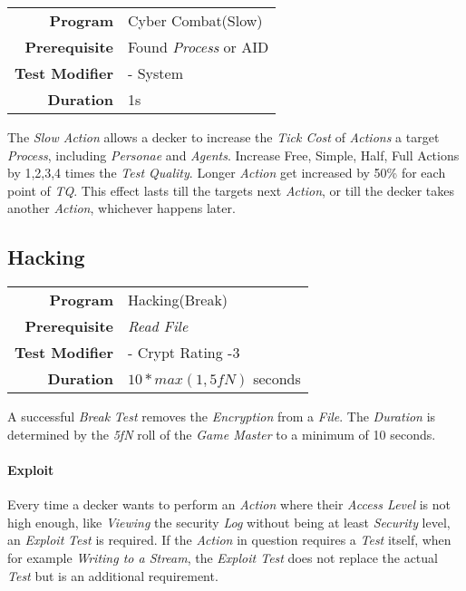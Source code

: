 \begin{tabular}{rl}
    \textbf{Program}       & Cyber Combat(Slow)          \\
    \textbf{Prerequisite}  & Found \emph{Process} or AID \\
    \textbf{Test Modifier} & - System                    \\
    \textbf{Duration}      & 1s                          \\
\end{tabular}

\hfill

The \emph{Slow Action} allows a decker to increase the \emph{Tick Cost} of
\emph{Actions} a target \emph{Process}, including \emph{Personae} and \emph{Agents}.
Increase Free, Simple, Half, Full Actions by 1,2,3,4 times the \emph{Test Quality}.
Longer \emph{Action} get increased by 50\% for each point of \emph{TQ}.
This effect lasts till the targets next \emph{Action}, or till the decker takes
another \emph{Action}, whichever happens later.

\subsection{Hacking}

\label{par:break}

\begin{tabular}{rl}
    \textbf{Program}       & Hacking(Break)                               \\
    \textbf{Prerequisite}  & \emph{Read File}                             \\
    \textbf{Test Modifier} & - Crypt Rating -3                            \\
    \textbf{Duration}      & $10 * \textit{max}(1, \textit{5fN})$ seconds \\
\end{tabular}

\hfill

A successful \emph{Break} \emph{Test} removes the \emph{Encryption} from a
\emph{File}. The \emph{Duration} is determined by the \emph{5fN} roll of the
\emph{Game Master} to a minimum of 10 seconds.

\paragraph{Exploit}

Every time a decker wants to perform an \emph{Action} where their \emph{Access Level}
is not high enough, like \emph{Viewing} the security \emph{Log} without being
at least \emph{Security} level, an \emph{Exploit} \emph{Test} is required.
If the \emph{Action} in question requires a \emph{Test} itself,
when for example \emph{Writing to a Stream}, the \emph{Exploit Test} does not
replace the actual \emph{Test} but is an additional requirement.

